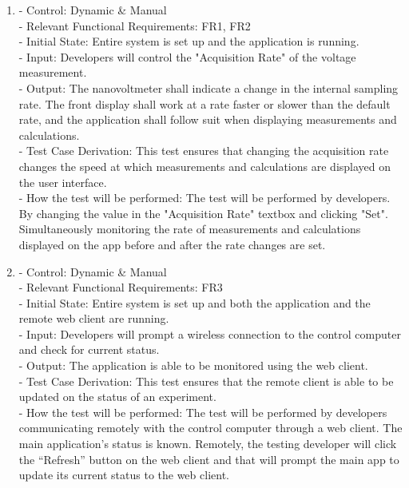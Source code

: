 \documentclass[12pt, titlepage]{article}
\begin{document}
\begin{enumerate}[{FR-T}1.]
    \item\label{T5} - Control: Dynamic \& Manual\\ 
    - Relevant Functional Requirements: FR1, FR2\\
    - Initial State: Entire system is set up and the application is running.\\
    - Input: Developers will control the "Acquisition Rate" of the voltage measurement.\\
    - Output: The nanovoltmeter shall indicate a change in the internal sampling rate. The front display shall work at a rate faster or slower than the default rate, and the application shall follow suit when displaying measurements and calculations.\\
    - Test Case Derivation: This test ensures that changing the acquisition rate changes the speed at which measurements and calculations are displayed on the user interface.\\
    - How the test will be performed: The test will be performed by developers. By changing the value in the "Acquisition Rate" textbox and clicking "Set". Simultaneously monitoring the rate of measurements and calculations displayed on the app before and after the rate changes are set.

    \item\label{T6} - Control: Dynamic \& Manual\\ 
    - Relevant Functional Requirements: FR3\\
    - Initial State: Entire system is set up and both the application and the remote web client are running.\\
    - Input: Developers will prompt a wireless connection to the control computer and check for current status.\\
    - Output: The application is able to be monitored using the web client.\\
    - Test Case Derivation: This test ensures that the remote client is able to be updated on the status of an experiment.\\
    - How the test will be performed: The test will be performed by developers communicating remotely with the control computer through a web client. The main application's status is known. Remotely, the testing developer will click the “Refresh” button on the web client and that will prompt the main app to update its current status to the web client.


\end{enumerate}
\end{document}
